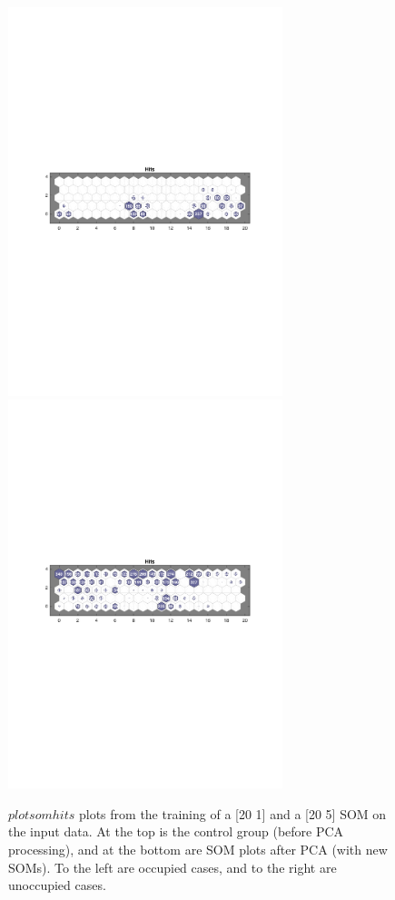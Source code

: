 \documentclass[10pt, oneside]{article}
\begin{document}
\begin{figure}[h]
\begin{center}
\includegraphics[width=8cm]{pca-fail2-ones.pdf} \includegraphics[width=8cm]{pca-fail2-zeros.pdf}
\end{center}
\caption{\label{fig:pca-fail} $plotsomhits$ plots from the training of a [20 1] and a [20 5] SOM on the input data. At the top is the control group (before PCA processing), and at the bottom are SOM plots after PCA (with new SOMs). To the left are occupied cases, and to the right are unoccupied cases.}
\end{figure}
\end{document}
